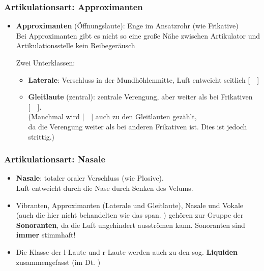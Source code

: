 \begin{frame}
\frametitle{Artikulationsart: Approximanten}

		\begin{itemize}
			\item \textbf{Approximanten} (Öffnungslaute): Enge im Ansatzrohr (wie Frikative)\\
			Bei Approximanten gibt es nicht so eine große Nähe zwischen Artikulator und Artikulationsstelle \ras kein Reibegeräusch
			
			 Zwei Unterklassen:
			
			\begin{itemize}
				
				\item \textbf{Laterale}: Verschluss in der Mundhöhlenmitte, Luft entweicht seitlich [~~]
				
				\item \textbf{Gleitlaute} (zentral): zentrale Verengung, aber weiter als bei Frikativen [~~].\\
				(Manchmal wird [~~] auch zu den Gleitlauten gezählt,\\
                                  da die Verengung weiter als bei anderen Frikativen ist. Dies ist jedoch strittig.)
			\end{itemize}
			
		\end{itemize}	

\end{frame}


\begin{frame}
\frametitle{Artikulationsart: Nasale}
		\begin{itemize}
			\item \textbf{Nasale}: totaler oraler Verschluss (wie Plosive).\\
				Luft entweicht durch die Nase durch Senken des Velums.
			 
			 \ea \textipa{[ m, n, N ]}
			 \z
		
		\item Vibranten, Approximanten (Laterale und Gleitlaute), Nasale und Vokale (auch die hier nicht behandelten  wie das span. \textipa{[~R~]}) gehören zur Gruppe der \textbf{Sonoranten}, da die Luft ungehindert ausströmen kann. Sonoranten sind \textbf{immer} stimmhaft!
		
		\item Die Klasse der l-Laute und r-Laute werden auch zu den sog. \textbf{Liquiden} zusammengefasst (im Dt. \textipa{[ l, r, \textscr ]})
	\end{itemize}

	
\end{frame}


